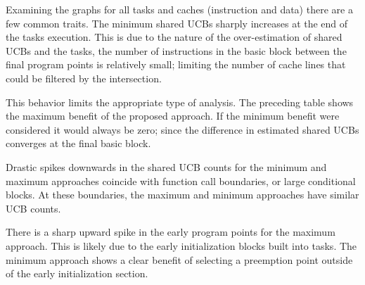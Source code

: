 %
%
%
%
%
%
%

Examining the graphs for all tasks and caches (instruction and data)
there are a few common traits. The minimum shared UCBs sharply
increases at the end of the tasks execution. This is due to the nature
of the over-estimation of shared UCBs and the tasks, the number of
instructions in the basic block between the final program points is
relatively small; limiting the number of cache lines that could be
filtered by the intersection.

This behavior limits the appropriate type of analysis. The preceding
table shows the maximum benefit of the proposed approach. If the
minimum benefit were considered it would always be zero; since the
difference in estimated shared UCBs converges at the final basic
block.

Drastic spikes downwards in the shared UCB counts for the minimum and
maximum approaches coincide with function call boundaries, or large
conditional blocks. At these boundaries, the maximum and minimum
approaches have similar UCB counts. 

There is a sharp upward spike in the early program points for the
maximum approach. This is likely due to the early initialization
blocks built into tasks. The minimum approach shows a clear benefit of
selecting a preemption point outside of the early initialization
section.
\vspace{-10pt}

